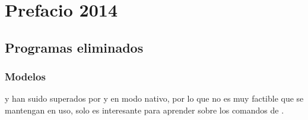 
\chapter{Prefacio 2014}
\section*{Programas eliminados}

\subsection*{Modelos}
 y  han suido superados por  y  en modo nativo, por lo que no es muy factible que se mantengan en uso, solo  es interesante para aprender sobre los comandos de .
